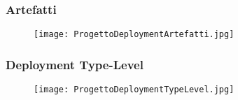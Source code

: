 \subsubsection{Artefatti}

\begin{figure}[h!]
    \begin{center}
        \texttt{[image: ProgettoDeploymentArtefatti.jpg]}
    \end{center}
\end{figure}
\newpage
\subsubsection{Deployment Type-Level}

\begin{figure}[h!]
    \begin{center}
        \texttt{[image: ProgettoDeploymentTypeLevel.jpg]}
    \end{center}
\end{figure}
